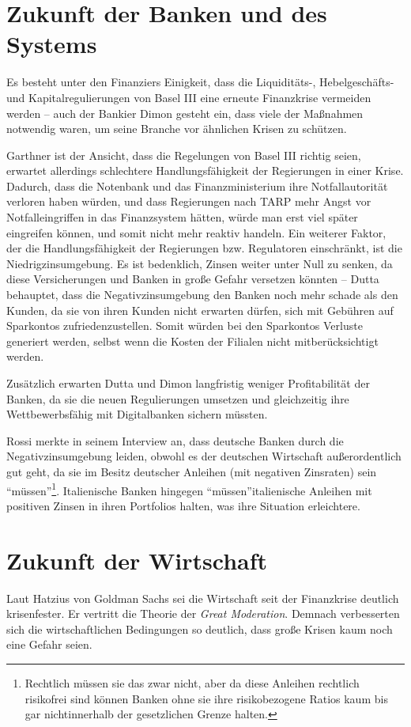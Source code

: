 \documentclass[a4paper,11pt]{report}
\begin{document}
\section{Zukunft der Banken und des Systems}
Es besteht unter den Finanziers Einigkeit, dass
die Liquidit\"ats-, Hebelgesch\"afts- und Kapitalregulierungen von Basel III
eine erneute Finanzkrise vermeiden werden -- auch der Bankier Dimon
gesteht ein, dass viele der Maßnahmen notwendig waren, um seine Branche
vor \"ahnlichen Krisen zu sch\"utzen.

Garthner ist der Ansicht, dass die Regelungen von Basel III
richtig seien, erwartet allerdings schlechtere
Handlungsf\"ahigkeit der Regierungen in einer Krise. Dadurch,
dass die Notenbank und das Finanzministerium ihre Notfallautorität
verloren haben w\"urden, und dass Regierungen nach TARP mehr Angst
vor Notfalleingriffen in das Finanzsystem h\"atten, w\"urde man erst
viel sp\"ater eingreifen k\"onnen, und somit nicht mehr reaktiv handeln.
Ein weiterer Faktor, der die Handlungsf\"ahigkeit der Regierungen
bzw. Regulatoren einschr\"ankt, ist die Niedrigzinsumgebung.
Es ist bedenklich, Zinsen weiter unter Null zu senken, da diese
Versicherungen und Banken in große Gefahr versetzen k\"onnten -- Dutta behauptet, dass die Negativzinsumgebung
den Banken noch mehr schade als den Kunden, da sie von ihren
Kunden nicht erwarten d\"urfen, sich mit Geb\"uhren auf Sparkontos
zufriedenzustellen. Somit w\"urden bei den Sparkontos Verluste generiert werden,
selbst wenn die Kosten der Filialen nicht mitber\"ucksichtigt werden.

Zus\"atzlich erwarten Dutta und Dimon langfristig weniger Profitabilit\"at
der Banken, da sie die neuen Regulierungen umsetzen und gleichzeitig
ihre Wettbewerbsf\"ahig mit Digitalbanken sichern m\"ussten.

Rossi merkte in
seinem Interview an, dass deutsche Banken durch die Negativzinsumgebung
leiden, obwohl es der deutschen Wirtschaft außerordentlich gut geht,
da sie im Besitz deutscher Anleihen (mit negativen Zinsraten) sein
\enquote{m\"ussen}\footnote{
Rechtlich m\"ussen sie das zwar nicht, aber da diese Anleihen
rechtlich risikofrei sind k\"onnen Banken ohne sie ihre risikobezogene Ratios kaum bis
gar nichtinnerhalb der gesetzlichen Grenze halten.
}.
Italienische Banken hingegen \enquote{m\"ussen}\footnotemark[2] italienische Anleihen 
mit positiven Zinsen in ihren Portfolios halten, was ihre
Situation erleichtere.

\section{Zukunft der Wirtschaft}
Laut Hatzius von Goldman Sachs sei die Wirtschaft
seit der Finanzkrise deutlich krisenfester. Er vertritt die Theorie
der \textit{Great Moderation}. Demnach verbesserten sich 
die wirtschaftlichen Bedingungen so deutlich, dass große
Krisen kaum noch eine Gefahr seien.
\end{document}
